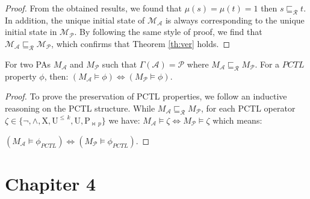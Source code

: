 \begin{proof}
From the obtained results, we found that $\mu(s)=\mu(t)=1$ then $s\sqsubseteq_{\mathcal{R}}t$. In addition, the unique initial state of $\mathcal{M_{A}}$ is always corresponding to the unique initial state in $\mathcal{M_{P}}$. By following the same style of proof, we find that $\mathcal{M_{A}}\sqsubseteq_{\mathcal{R}}\mathcal{M_{P}}$, which confirms that Theorem \ref{th:ver} holds.

\end{proof}
\begin{proposition}\label{Th:VerPctlPreservation}
For two PAs $M_\mathcal{A}$ and $M_\mathcal{P}$ such that $\Gamma(\mathcal{A})=\mathcal{P}$ where $M_\mathcal{A}\sqsubseteq_{\mathscr{R}}M_\mathcal{P}$. For a $PCTL$ property $\phi$, then: $(M_\mathcal{A}\models\phi)\Leftrightarrow(M_\mathcal{P}\models\phi)$.
\end{proposition}
\begin{proof}

To prove the preservation of PCTL properties, we follow an inductive reasoning on the PCTL structure. While $M_\mathcal{A}\sqsubseteq_{\mathcal{R}}M_\mathcal{P}$, for each PCTL operator $\zeta\in\{\neg,\wedge,\mathrm{X},\mathrm{U}^{\leq\,k},\mathrm{U},\mathrm{P}_{\bowtie\,p}\}$ we have:
$M_\mathcal{A}\models\zeta \Longleftrightarrow M_\mathcal{P}\models\zeta$ which means:

$(M_\mathcal{A}\models\phi_{PCTL})\Longleftrightarrow(M_\mathcal{P}\models\phi_{PCTL})$.

\end{proof}

\chapter{Chapiter 4}
